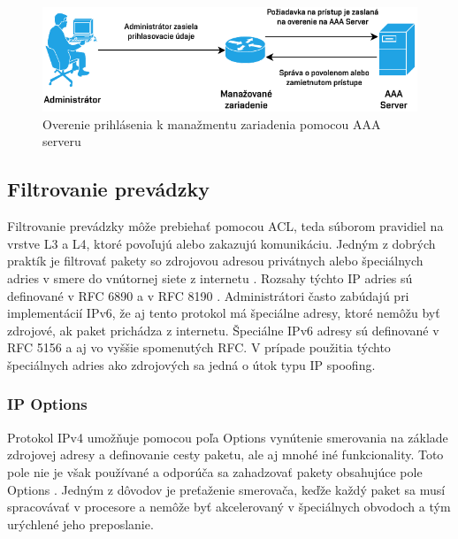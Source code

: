 \begin{figure}[H]
	\begin{center}
		\includegraphics[scale=1.1]{obrazky/AAA.pdf}
	\end{center}
	\caption[Overenie prihlásenia k manažmentu zariadenia pomocou AAA serveru]{Overenie prihlásenia k manažmentu zariadenia pomocou AAA serveru}
	\label{fig:aaa-mngmt}
\end{figure} 



\subsection*{Filtrovanie prevádzky}
Filtrovanie prevádzky môže prebiehať pomocou ACL, teda súborom pravidiel na vrstve L3 a L4, ktoré povoľujú alebo zakazujú komunikáciu. Jedným z dobrých praktík je filtrovať pakety so zdrojovou adresou privátnych alebo špeciálnych adries v smere do vnútornej siete z internetu \cite{Jackson2010}. Rozsahy týchto IP adries sú definované v RFC 6890 \cite{rfc6890al6BqxiLuoAdpLeG} a v RFC 8190 \cite{rfc8190O1cp1uhrCiYj0LYK}. Administrátori často zabúdajú pri implementácií IPv6, že aj tento protokol má špeciálne adresy, ktoré nemôžu byť zdrojové, ak paket prichádza z internetu. Špeciálne IPv6 adresy sú definované v RFC 5156 \cite{rfc5156lPYdBFaqWC5RwyJI} a aj vo vyššie spomenutých RFC. V prípade použitia týchto špeciálnych adries ako zdrojových sa jedná o útok typu IP spoofing.

\subsubsection*{IP Options}
Protokol IPv4 umožňuje pomocou poľa Options vynútenie smerovania na základe zdrojovej adresy a definovanie cesty paketu, ale aj mnohé iné funkcionality. Toto pole nie je však používané a odporúča sa zahadzovať pakety obsahujúce pole Options \cite{Singh2018}. Jedným z dôvodov je preťaženie smerovača, keďže každý paket sa musí spracovávať v procesore a nemôže byť akcelerovaný v špeciálnych obvodoch a tým urýchlené jeho preposlanie. 

